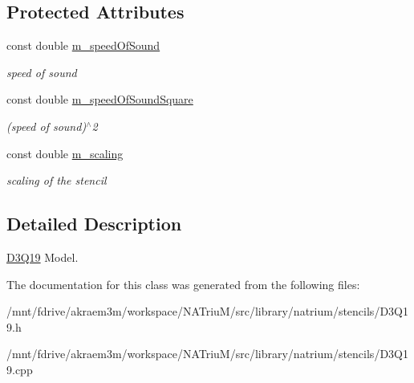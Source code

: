 \subsection*{Protected Attributes}
\begin{DoxyCompactItemize}
\item 
\hypertarget{classnatrium_1_1D3Q19_aa993e9e0399c46c54a8d7abd9ba4ecb9}{
const double \hyperlink{classnatrium_1_1D3Q19_aa993e9e0399c46c54a8d7abd9ba4ecb9}{m\_\-speedOfSound}}
\label{classnatrium_1_1D3Q19_aa993e9e0399c46c54a8d7abd9ba4ecb9}

\begin{DoxyCompactList}\small\item\em speed of sound \item\end{DoxyCompactList}\item 
\hypertarget{classnatrium_1_1D3Q19_aee2e25de1cdfa530b98df8e09884c47b}{
const double \hyperlink{classnatrium_1_1D3Q19_aee2e25de1cdfa530b98df8e09884c47b}{m\_\-speedOfSoundSquare}}
\label{classnatrium_1_1D3Q19_aee2e25de1cdfa530b98df8e09884c47b}

\begin{DoxyCompactList}\small\item\em (speed of sound)$^\wedge$2 \item\end{DoxyCompactList}\item 
\hypertarget{classnatrium_1_1D3Q19_abe8a49d87735513e5c18091e8596bc38}{
const double \hyperlink{classnatrium_1_1D3Q19_abe8a49d87735513e5c18091e8596bc38}{m\_\-scaling}}
\label{classnatrium_1_1D3Q19_abe8a49d87735513e5c18091e8596bc38}

\begin{DoxyCompactList}\small\item\em scaling of the stencil \item\end{DoxyCompactList}\end{DoxyCompactItemize}


\subsection{Detailed Description}
\hyperlink{classnatrium_1_1D3Q19}{D3Q19} Model. 

The documentation for this class was generated from the following files:\begin{DoxyCompactItemize}
\item 
/mnt/fdrive/akraem3m/workspace/NATriuM/src/library/natrium/stencils/D3Q19.h\item 
/mnt/fdrive/akraem3m/workspace/NATriuM/src/library/natrium/stencils/D3Q19.cpp\end{DoxyCompactItemize}
